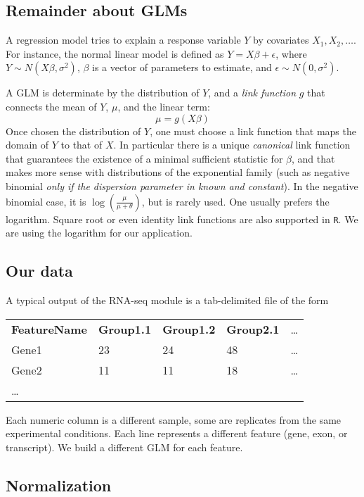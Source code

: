 \documentclass[a4paper,11pt]{article}
\begin{document}
\subsection{Remainder about GLMs}
A regression model tries to explain a response variable $Y$ by covariates $X_1,X_2,\ldots$. For instance, the normal linear model is defined as $ Y = X\beta + \epsilon$, where $Y \sim N(X\beta,\sigma^2)$, $\beta$ is a vector of parameters to estimate, and $\epsilon \sim N(0,\sigma^2)$.

A GLM is determinate by the distribution of $Y$, and a \emph{link function} $g$ that connects the mean of $Y$, $\mu$, and the linear term:
$$ \mu = g(X\beta) $$
Once chosen the distribution of $Y$, one must choose a link function that maps the domain of $Y$ to that of $X$. In particular there is a unique \emph{canonical} link function that guarantees the existence of a minimal sufficient statistic for $\beta$, and that makes more sense with distributions of the exponential family (such as negative binomial \emph{only if the dispersion parameter in known and constant}). In the negative binomial case, it is $\log(\frac{\mu}{\mu+\theta})$, but is rarely used. One usually prefers the logarithm. Square root or even identity link functions are also supported in \texttt{R}. We are using the logarithm for our application.

\subsection{Our data}

A typical output of the RNA-seq module is a tab-delimited file of the form

\vspace{0.5 cm}
\begin{tabular}{lllll}
\textbf{FeatureName} & \textbf{Group1.1} & \textbf{Group1.2} & \textbf{Group2.1} & \ldots \\
Gene1       & 23       & 24       & 48       & \ldots \\
Gene2       & 11       & 11       & 18       & \ldots \\
\ldots
\end{tabular}
\vspace{0.5 cm}

Each numeric column is a different sample, some are replicates from the same experimental conditions. Each line represents a different feature (gene, exon, or transcript). We build a different GLM for each feature.

\subsection{Normalization}
\end{document}
